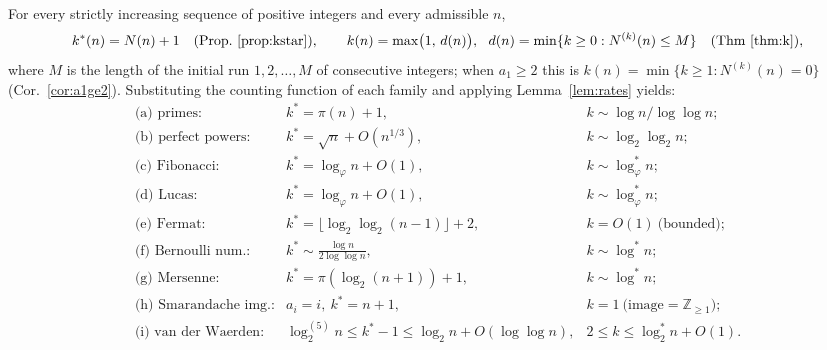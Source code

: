 \documentclass[12pt]{article}
\theoremstyle{definition}
\begin{document}
For every strictly increasing sequence of positive integers and every admissible $n$,
\[
  k^*(n)=N(n)+1\quad(\text{Prop.~\ref{prop:kstar}}),\qquad
  k(n)=\max\bigl(1,\,d(n)\bigr),\ \ d(n)=\min\{k\ge0:N^{(k)}(n)\le M\}\quad(\text{Thm~\ref{thm:k}}),
\]
where $M$ is the length of the initial run $1,2,\dots,M$ of consecutive integers;
when $a_1\ge2$ this is $k(n)=\min\{k\ge1:N^{(k)}(n)=0\}$
(Cor.~\ref{cor:a1ge2}). Substituting the counting function of each family and applying
Lemma~\ref{lem:rates} yields:
\[
\begin{array}{lll}
\text{(a) primes:} & k^*=\pi(n)+1, & k\sim \log n/\log\log n;\\
\text{(b) perfect powers:} & k^*=\sqrt n+O(n^{1/3}), & k\sim\log_2\log_2 n;\\
\text{(c) Fibonacci:} & k^*=\log_\varphi n+O(1), & k\sim\log^*_\varphi n;\\
\text{(d) Lucas:} & k^*=\log_\varphi n+O(1), & k\sim\log^*_\varphi n;\\
\text{(e) Fermat:} & k^*=\lfloor\log_2\log_2(n-1)\rfloor+2, & k=O(1)\ \text{(bounded)};\\
\text{(f) Bernoulli num.:} & k^*\sim \tfrac{\log n}{2\log\log n}, & k\sim\log^* n;\\
\text{(g) Mersenne:} & k^*=\pi(\log_2(n+1))+1, & k\sim\log^* n;\\
\text{(h) Smarandache img.:} & a_i=i,\ k^*=n+1, & k=1\ \text{(image}=\mathbb Z_{\ge1});\\
\text{(i) van der Waerden:} & \log^{(5)}_2 n\le k^*-1\le\log_2 n+O(\log\log n), & 2\le k\le\log^*_2 n+O(1).
\end{array}
\]
\end{document}
